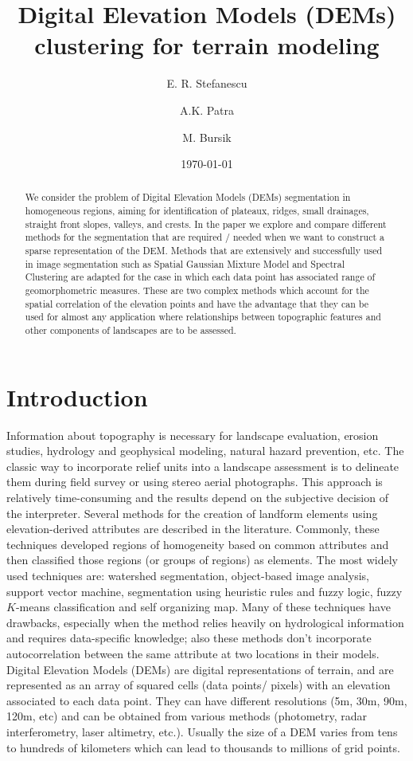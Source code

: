 \documentclass[12pt,letterpaper]{article}
\title{Digital Elevation Models (DEMs) clustering for terrain modeling}
\author[1]{ E. R. Stefanescu }
\author[1]{A.K. Patra}
\author[2]{M. Bursik}
\affil[1]{Department of Mechanical and Aerospace Engineering, University at Buffalo, Buffalo, NY 14260}
\affil[2]{Department of Geology, University at Buffalo, Buffalo, NY 14260 }
\date{\today}
\begin{document}
\linenumbers
\maketitle

\begin{abstract}
We consider the problem of Digital Elevation Models (DEMs) segmentation 
in homogeneous regions, aiming for identification of plateaux, ridges, small drainages,
straight front slopes, valleys, and crests.  
In the paper we explore and compare different methods 
for the segmentation that are required / needed when we want to construct a 
sparse representation of the DEM.  Methods that are extensively and successfully used in image segmentation such as Spatial Gaussian Mixture Model and Spectral Clustering are adapted for the case in which each data point has associated range of geomorphometric measures. These are two complex methods which account for the spatial correlation of the elevation points and have the advantage that they can be used for almost any application where relationships between topographic features and 
other components of landscapes are to be assessed.
\end{abstract}

\section{Introduction}
Information about topography is necessary for landscape evaluation, erosion studies,
hydrology and geophysical modeling, natural hazard prevention, etc. The classic way to 
incorporate relief units into a landscape assessment is to delineate them during field survey
or using stereo aerial photographs. This approach is relatively time-consuming and the results
depend on the subjective decision of the interpreter.
Several methods for the creation of landform elements using elevation-derived attributes are
described in the literature. Commonly, these techniques developed regions of homogeneity based
on common attributes and then classified those regions (or groups of regions) as elements. The most widely used techniques
are: watershed segmentation, object-based image analysis, support vector machine, segmentation
using heuristic rules and fuzzy logic, fuzzy $K$-means classification and self organizing map. Many of these
techniques have drawbacks, especially when the method relies heavily on hydrological information and 
requires data-specific knowledge; also these methods don't incorporate autocorrelation between 
the same attribute at two locations in their models.
Digital Elevation Models (DEMs) are digital representations of terrain, and are represented as an array of 
squared cells (data points/ pixels) with an elevation associated to each data point. They can have
different resolutions (5m, 30m, 90m, 120m, etc) and can be obtained from various methods 
(photometry, radar interferometry, laser altimetry, etc.). Usually the size of a DEM varies from
tens to hundreds of kilometers which can lead to thousands to millions of grid points. 
 
\end{document}
